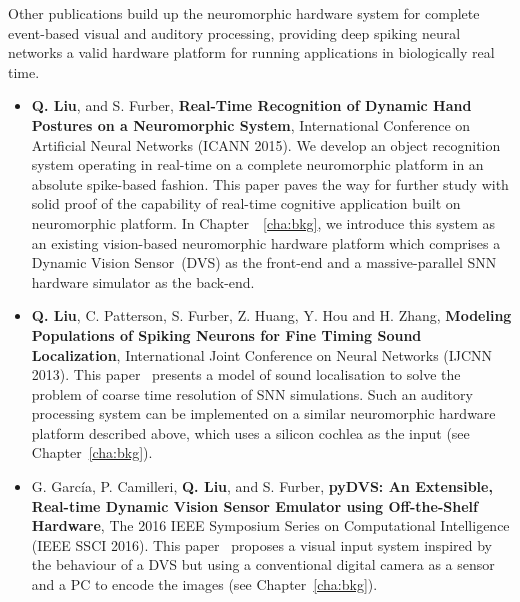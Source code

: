 	Other publications build up the neuromorphic hardware system for complete event-based visual and auditory processing, providing deep spiking neural networks a valid hardware platform for running applications in biologically real time.
\begin{itemize}
	\item 
	\textbf{Q. Liu}, and S. Furber, \textbf{Real-Time Recognition of Dynamic Hand Postures on a Neuromorphic System}, International Conference on Artificial Neural Networks (ICANN 2015).
	We develop an object recognition system operating in real-time on a complete neuromorphic platform in an absolute spike-based fashion.
	This paper paves the way for further study with solid proof of the capability of real-time cognitive application built on neuromorphic platform.
	In Chapter~~\ref{cha:bkg}, we introduce this system as an existing vision-based neuromorphic hardware platform which comprises a Dynamic Vision Sensor~(DVS) as the front-end and a massive-parallel SNN hardware simulator as the back-end. 
	
	\item
	\textbf{Q. Liu}, C. Patterson, S. Furber, Z. Huang, Y. Hou and H. Zhang, \textbf{Modeling Populations of Spiking Neurons for Fine Timing Sound Localization}, International Joint Conference on Neural Networks (IJCNN 2013).
	This paper~\citep{liu2013modeling} presents a model of sound localisation to solve the problem of coarse time resolution of SNN simulations.
	Such an auditory processing system can be implemented on a similar neuromorphic hardware platform described above, which uses a silicon cochlea as the input (see Chapter~\ref{cha:bkg}).
	
	\item 
	G. Garc\'ia, P. Camilleri, \textbf{Q. Liu}, and S. Furber, \textbf{pyDVS: An Extensible, Real-time Dynamic Vision Sensor Emulator using Off-the-Shelf Hardware}, The 2016 IEEE Symposium Series on Computational Intelligence (IEEE SSCI 2016).
	This paper~\citep{7850249} proposes a visual input system inspired by the behaviour of a DVS but using a conventional digital camera as a sensor and a PC to encode the images (see Chapter~\ref{cha:bkg}).
\end{itemize}


